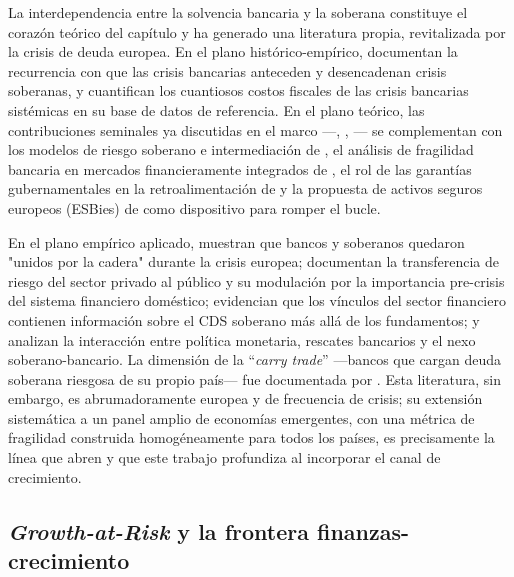 La interdependencia entre la solvencia bancaria y la soberana constituye el corazón teórico del capítulo y ha generado una literatura propia, revitalizada por la crisis de deuda europea. En el plano histórico-empírico, \citet{ReinhartRogoff2009,ReinhartRogoff2011} documentan la recurrencia con que las crisis bancarias anteceden y desencadenan crisis soberanas, y \citet{LaevenValencia2013,LaevenValencia2020} cuantifican los cuantiosos costos fiscales de las crisis bancarias sistémicas en su base de datos de referencia. En el plano teórico, las contribuciones seminales ya discutidas en el marco —\citet{FarhiTirole2018b}, \citet{AcharyaDrechslerSchnabl2014b}, \citet{GennaioliMartinRossi2014}— se complementan con los modelos de riesgo soberano e intermediación de \citet{Bocola2016}, el análisis de fragilidad bancaria en mercados financieramente integrados de \citet{BoltonJeanne2011}, el rol de las garantías gubernamentales en la retroalimentación de \citet{Leonello2018} y la propuesta de activos seguros europeos (ESBies) de \citet{BrunnermeierEtAl2016} como dispositivo para romper el bucle.

En el plano empírico aplicado, \citet{ModySandri2012} muestran que bancos y soberanos quedaron "unidos por la cadera" durante la crisis europea; \citet{DieckmannPlank2012} documentan la transferencia de riesgo del sector privado al público y su modulación por la importancia pre-crisis del sistema financiero doméstico; \citet{KallestrupLandoMurgoci2016} evidencian que los vínculos del sector financiero contienen información sobre el CDS soberano más allá de los fundamentos; y \citet{FratzscherRieth2019} analizan la interacción entre política monetaria, rescates bancarios y el nexo soberano-bancario. La dimensión de la ``\textit{carry trade}'' —bancos que cargan deuda soberana riesgosa de su propio país— fue documentada por \citet{AcharyaSteffen2015}. Esta literatura, sin embargo, es abrumadoramente europea y de frecuencia de crisis; su extensión sistemática a un panel amplio de economías emergentes, con una métrica de fragilidad construida homogéneamente para todos los países, es precisamente la línea que abren \citet{Chari2024b} y que este trabajo profundiza al incorporar el canal de crecimiento.

\subsection{\textit{Growth-at-Risk} y la frontera finanzas-crecimiento}

